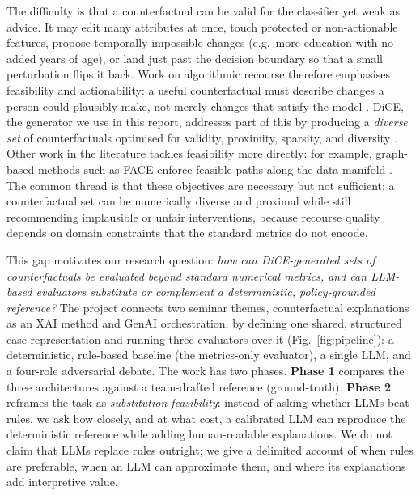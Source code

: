 \documentclass[letterpaper]{article}
\begin{document}
The difficulty is that a counterfactual can be valid for the classifier yet weak as advice. It may edit many attributes at once, touch protected or non-actionable features, propose temporally impossible changes (e.g.\ more education with no added years of age), or land just past the decision boundary so that a small perturbation flips it back. Work on algorithmic recourse therefore emphasises feasibility and actionability: a useful counterfactual must describe changes a person could plausibly make, not merely changes that satisfy the model \citep{karimi2021algorithmic}. DiCE, the generator we use in this report, addresses part of this by producing a \emph{diverse set} of counterfactuals optimised for validity, proximity, sparsity, and diversity \citep{mothilal2020explaining}. Other work in the literature tackles feasibility more directly: for example, graph-based methods such as FACE enforce feasible paths along the data manifold \citep{poyiadzi2020face}. The common thread is that these objectives are necessary but not sufficient: a counterfactual set can be numerically diverse and proximal while still recommending implausible or unfair interventions, because recourse quality depends on domain constraints that the standard metrics do not encode.

This gap motivates our research question: \emph{how can DiCE-generated sets of counterfactuals be evaluated beyond standard numerical metrics, and can LLM-based evaluators substitute or complement a deterministic, policy-grounded reference?} The project connects two seminar themes, counterfactual explanations as an XAI method and GenAI orchestration, by defining one shared, structured case representation and running three evaluators over it (Fig.~\ref{fig:pipeline}): a deterministic, rule-based baseline (the metrics-only evaluator), a single LLM, and a four-role adversarial debate. The work has two phases. \textbf{Phase 1} compares the three architectures against a team-drafted reference (ground-truth). \textbf{Phase 2} reframes the task as \emph{substitution feasibility}: instead of asking whether LLMs beat rules, we ask how closely, and at what cost, a calibrated LLM can reproduce the deterministic reference while adding human-readable explanations. We do not claim that LLMs replace rules outright; we give a delimited account of when rules are preferable, when an LLM can approximate them, and where its explanations add interpretive value.
\end{document}
